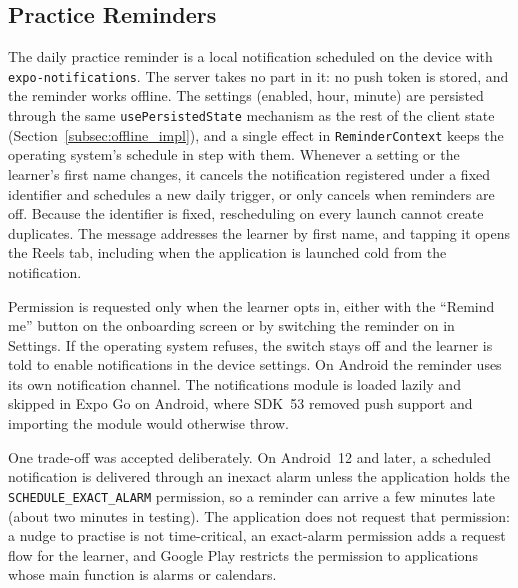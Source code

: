     \subsection{Practice Reminders}
    \label{subsec:reminders_impl}
    \begin{sloppypar}
    The daily practice reminder is a local notification scheduled on the device with \texttt{expo-\allowbreak notifications}. The server takes no part in it: no push token is stored, and the reminder works offline. The settings (enabled, hour, minute) are persisted through the same \texttt{usePersistedState} mechanism as the rest of the client state (Section~\ref{subsec:offline_impl}), and a single effect in \texttt{ReminderContext} keeps the operating system's schedule in step with them. Whenever a setting or the learner's first name changes, it cancels the notification registered under a fixed identifier and schedules a new daily trigger, or only cancels when reminders are off. Because the identifier is fixed, rescheduling on every launch cannot create duplicates. The message addresses the learner by first name, and tapping it opens the Reels tab, including when the application is launched cold from the notification.
    \end{sloppypar}

    Permission is requested only when the learner opts in, either with the ``Remind me'' button on the onboarding screen or by switching the reminder on in Settings. If the operating system refuses, the switch stays off and the learner is told to enable notifications in the device settings. On Android the reminder uses its own notification channel. The notifications module is loaded lazily and skipped in Expo Go on Android, where SDK~53 removed push support and importing the module would otherwise throw.

    One trade-off was accepted deliberately. On Android~12 and later, a scheduled notification is delivered through an inexact alarm unless the application holds the \texttt{SCHEDULE\_EXACT\_ALARM} permission, so a reminder can arrive a few minutes late (about two minutes in testing). The application does not request that permission: a nudge to practise is not time-critical, an exact-alarm permission adds a request flow for the learner, and Google Play restricts the permission to applications whose main function is alarms or calendars.

